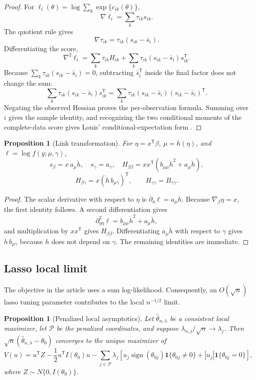 \documentclass[a4paper,fleqn]{cas-sc}
\newtheorem{proposition}[theorem]{Proposition}
\newcommand{\ind}{\mathbf 1}
\newcommand{\T}{\mathsf T}
\newcommand{\PEN}{\mathcal P}
\numberwithin{equation}{section}
\begin{document}
\begin{proof}
For $\ell_i(\theta)=\log\sum_k\exp\{c_{ik}(\theta)\}$,
\[
 \nabla\ell_i=\sum_k\tau_{ik}s_{ik}.
\]
The quotient rule gives
\[
 \nabla\tau_{ik}=\tau_{ik}(s_{ik}-\bar s_i).
\]
Differentiating the score,
\[
 \nabla^2\ell_i
 =\sum_k\tau_{ik}H_{ik}
 +\sum_k\tau_{ik}(s_{ik}-\bar s_i)s_{ik}^\T.
\]
Because $\sum_k\tau_{ik}(s_{ik}-\bar s_i)=0$, subtracting
$\bar s_i^\T$ inside the final factor does not change the sum:
\[
 \sum_k\tau_{ik}(s_{ik}-\bar s_i)s_{ik}^\T
 =\sum_k\tau_{ik}(s_{ik}-\bar s_i)(s_{ik}-\bar s_i)^\T.
\]
Negating the observed Hessian proves the per-observation formula. Summing over $i$ gives the sample identity, and recognizing the two conditional moments of the complete-data score gives Louis' conditional-expectation form \citep{louis1982information}.
\end{proof}

\begin{proposition}[Link transformation]
\label{supp:prop-chain}
For $\eta=x^\T\beta$, $\mu=h(\eta)$, and $\ell=\log f(y;\mu,\gamma)$,
\[
 s_\beta=x\,a_\mu\dot h,\quad s_\gamma=a_\gamma,\quad
 H_{\beta\beta}=xx^\T(b_{\mu\mu}\dot h^2+a_\mu\ddot h),
\]
\[
 H_{\beta\gamma}=x(\dot h\,b_{\mu\gamma})^\T,\qquad
 H_{\gamma\gamma}=B_{\gamma\gamma}.
\]
\end{proposition}

\begin{proof}
The scalar derivative with respect to $\eta$ is
$\partial_\eta\ell=a_\mu\dot h$. Because
$\nabla_\beta\eta=x$, the first identity follows. A second differentiation gives
\[
 \partial_{\eta\eta}^2\ell=b_{\mu\mu}\dot h^2+a_\mu\ddot h,
\]
and multiplication by $xx^\T$ gives $H_{\beta\beta}$. Differentiating
$a_\mu\dot h$ with respect to $\gamma$ gives
$\dot h\,b_{\mu\gamma}$ because $h$ does not depend on $\gamma$. The remaining identities are immediate.
\end{proof}

\subsection{Lasso local limit}

The objective in the article uses a sum log-likelihood. Consequently, an $O(\sqrt n)$ lasso tuning parameter contributes to the local $n^{-1/2}$ limit.

\begin{proposition}[Penalized local asymptotics]
\label{supp:prop-lasso}
Let $\widehat\theta_{n,\lambda}$ be a consistent local maximizer, let $\PEN$ be the penalized coordinates, and suppose $\lambda_{n,j}/\sqrt n\to\lambda_j$. Then $\sqrt n(\widehat\theta_{n,\lambda}-\theta_0)$ converges to the unique maximizer of
\[
 V(u)=u^\T Z-\frac12u^\T I(\theta_0)u
 -\sum_{j\in\PEN}\lambda_j
 \left[u_j\operatorname{sign}(\theta_{0j})\ind\{\theta_{0j}\neq0\}
 +|u_j|\ind\{\theta_{0j}=0\}\right],
\]
where $Z\sim N\{0,I(\theta_0)\}$.
\end{proposition}
\end{document}
